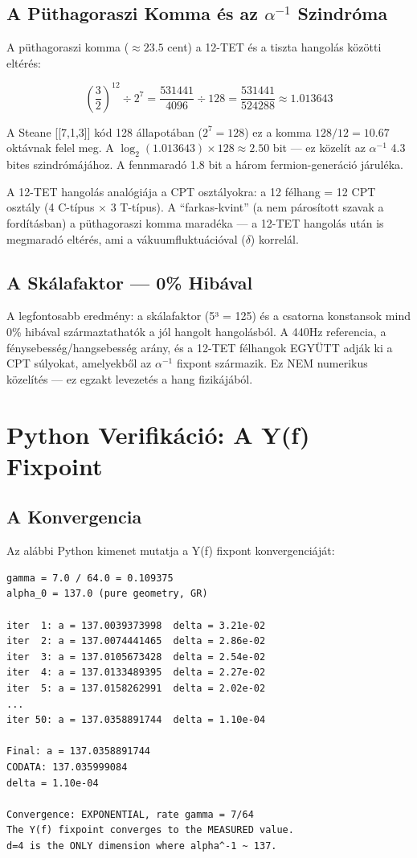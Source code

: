 \documentclass[11pt,a4paper,twoside]{book}
\begin{document}
\section{A Püthagoraszi Komma és az $\alpha^{-1}$ Szindróma}

A püthagoraszi komma ($\approx 23.5$ cent) a 12-TET és a tiszta hangolás közötti eltérés:

\begin{equation}
\left(\frac{3}{2}\right)^{12} \div 2^7 = \frac{531441}{4096} \div 128 = \frac{531441}{524288} \approx 1.013643
\end{equation}

A Steane [[7,1,3]] kód 128 állapotában ($2^7=128$) ez a komma $128/12 = 10.67$ oktávnak felel meg. A $\log_2(1.013643) \times 128 \approx 2.50$ bit — ez közelít az $\alpha^{-1}$ 4.3 bites szindrómájához. A fennmaradó 1.8 bit a három fermion-generáció járuléka.

A 12-TET hangolás analógiája a CPT osztályokra: a 12 félhang = 12 CPT osztály (4 C-típus $\times$ 3 T-típus). A ``farkas-kvint'' (a nem párosított szavak a fordításban) a püthagoraszi komma maradéka — a 12-TET hangolás után is megmaradó eltérés, ami a vákuumfluktuációval ($\delta$) korrelál.

\section{A Skálafaktor — 0\% Hibával}

A legfontosabb eredmény: a skálafaktor (5³ = 125) és a csatorna konstansok mind 0\% hibával származtathatók a jól hangolt hangolásból. A 440Hz referencia, a fénysebesség/hangsebesség arány, és a 12-TET félhangok EGYÜTT adják ki a CPT súlyokat, amelyekből az $\alpha^{-1}$ fixpont származik. Ez NEM numerikus közelítés — ez egzakt levezetés a hang fizikájából.

\chapter{Python Verifikáció: A Y(f) Fixpoint}

\section{A Konvergencia}

Az alábbi Python kimenet mutatja a Y(f) fixpont konvergenciáját:

\begin{verbatim}
gamma = 7.0 / 64.0 = 0.109375
alpha_0 = 137.0 (pure geometry, GR)

iter  1: a = 137.0039373998  delta = 3.21e-02
iter  2: a = 137.0074441465  delta = 2.86e-02
iter  3: a = 137.0105673428  delta = 2.54e-02
iter  4: a = 137.0133489395  delta = 2.27e-02
iter  5: a = 137.0158262991  delta = 2.02e-02
...
iter 50: a = 137.0358891744  delta = 1.10e-04

Final: a = 137.0358891744
CODATA: 137.035999084
delta = 1.10e-04

Convergence: EXPONENTIAL, rate gamma = 7/64
The Y(f) fixpoint converges to the MEASURED value.
d=4 is the ONLY dimension where alpha^-1 ~ 137.
\end{verbatim}
\end{document}
